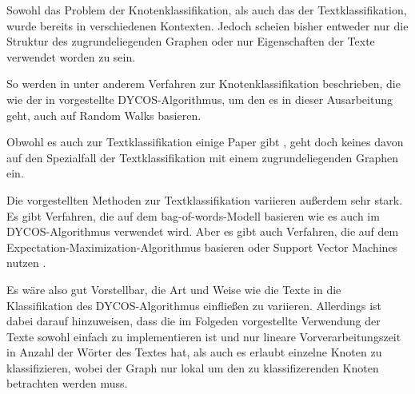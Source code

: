 Sowohl das Problem der Knotenklassifikation, als auch das der Textklassifikation,
wurde bereits in verschiedenen Kontexten. Jedoch scheien bisher entweder nur die Struktur des zugrundeliegenden Graphen oder nur Eigenschaften der Texte verwendet worden zu sein.

So werden in \cite{bhagat,szummer} unter anderem Verfahren zur Knotenklassifikation
beschrieben, die wie der in \cite{aggarwal2011} vorgestellte DYCOS-Algorithmus,
um den es in dieser Ausarbeitung geht, auch auf Random Walks basieren.

Obwohl es auch zur Textklassifikation einige Paper gibt \cite{Zhu02learningfrom,Jiang2010302}, geht doch keines davon auf den Spezialfall der Textklassifikation
mit einem zugrundeliegenden Graphen ein.

Die vorgestellten Methoden zur Textklassifikation variieren außerdem sehr stark.
Es gibt Verfahren, die auf dem bag-of-words-Modell basieren \cite{Ko:2012:STW:2348283.2348453}
wie es auch im DYCOS-Algorithmus verwendet wird. Aber es gibt auch Verfahren,
die auf dem Expectation-Maximization-Algorithmus basieren \cite{Nigam99textclassification}
oder Support Vector Machines nutzen \cite{Joachims98textcategorization}.

Es wäre also gut Vorstellbar, die Art und Weise wie die Texte in die Klassifikation
des DYCOS-Algorithmus einfließen zu variieren. Allerdings ist dabei darauf hinzuweisen,
dass die im Folgeden vorgestellte Verwendung der Texte sowohl einfach zu implementieren
ist und nur lineare Vorverarbeitungszeit in Anzahl der Wörter des Textes hat, 
als auch es erlaubt einzelne
Knoten zu klassifizieren, wobei der Graph nur lokal um den zu klassifizerenden
Knoten betrachten werden muss.
